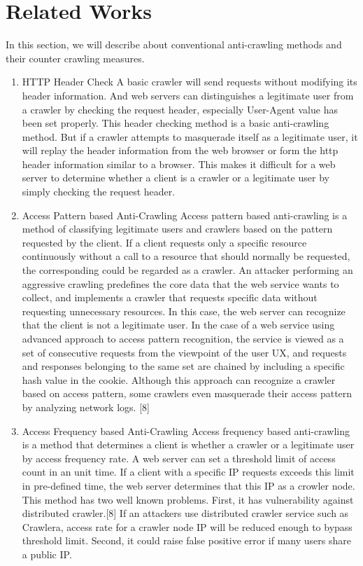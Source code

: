 \documentclass[sigconf,anonymous=true]{acmart}
\begin{document}
\section{Related Works}
In this section, we will describe about conventional anti-crawling methods and their counter crawling measures.
\begin{enumerate}
\item HTTP Header Check
\newline A basic crawler will send requests without modifying its header information. And web servers can distinguishes a legitimate user from a crawler by checking the request header, especially User-Agent value has been set properly. This header checking method is a basic anti-crawling method.
But if a crawler attempts to masquerade itself as a legitimate user, it will replay the header information from the web browser or form the http header information similar to a browser. This makes it difficult for a web server to determine whether a client is a crawler or a legitimate user by simply checking the request header.
\newline

\item Access Pattern based Anti-Crawling
\newline
Access pattern based anti-crawling is a method of classifying legitimate users and crawlers based on the pattern requested by the client. If a client requests only a specific resource continuously without a call to a resource that should normally be requested, the corresponding could be regarded as a crawler. An attacker performing an aggressive crawling predefines the core data that the web service wants to collect, and implements a crawler that requests specific data without requesting unnecessary resources. In this case, the web server can recognize that the client is not a legitimate user. In the case of a web service using advanced approach to access pattern recognition, the service is viewed as a set of consecutive requests from the viewpoint of the user UX, and requests and responses belonging to the same set are chained by including a specific hash value in the cookie. Although this approach can recognize a crawler based on access pattern, some crawlers even masquerade their access pattern by analyzing network logs. [8]
\newline 
\item Access Frequency based Anti-Crawling
\newline 
Access frequency based anti-crawling is a method that determines a client is whether a crawler or a legitimate user by access frequency rate. A web server can set a threshold limit of access count in an unit time. If a client with a specific IP requests exceeds this limit in pre-defined time, the web server determines that this IP as a crowler node. This method has two well known problems. First, it has vulnerability against distributed crawler.[8] If an attackers use distributed crawler service such as Crawlera, access rate for a crawler node IP will be reduced enough to bypass threshold limit. Second, it could raise false positive error if many users share a public IP.
\newline


\end{enumerate}
\end{document}
